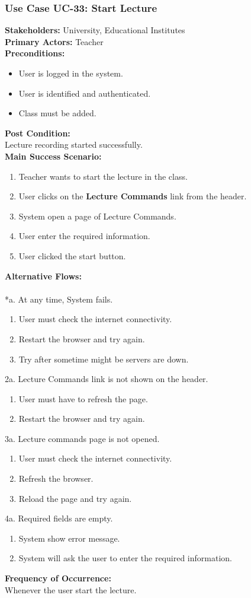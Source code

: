 \documentclass[12pt]{article}
\begin{document}
\subsubsection{Use Case UC-33: Start Lecture}
\textbf{Stakeholders: } University, Educational Institutes \\
\textbf{Primary Actors: }Teacher\\
\textbf{Preconditions:}
\begin{itemize}
\item User is logged in the system.
\item User is identified and authenticated.
\item Class must be added.
\end{itemize}
\textbf{Post Condition: }\\
Lecture recording started successfully.\\
\textbf{Main Success Scenario:}
\begin{enumerate}
\item Teacher wants to start the lecture in the class.
\item User clicks on the \textbf{Lecture Commands} link from the header.
\item System open a page of Lecture Commands.
\item User enter the required information.
\item User clicked the start button.
\end{enumerate}
\newpage
\textbf{Alternative Flows:}\\
\\
*a. At any time, System fails.
\begin{enumerate}
\item User must check the internet connectivity.
\item Restart the browser and try again.
\item Try after sometime might be servers are down.
\end{enumerate}
2a. Lecture Commands link is not shown on the header.
\begin{enumerate}
\item User must have to refresh the page.
\item Restart the browser and try again.
\end{enumerate} 
3a. Lecture commands page is not opened.
\begin{enumerate}
\item User must check the internet connectivity.
\item Refresh the browser.
\item Reload the page and try again.
\end{enumerate}
4a. Required fields are empty.
\begin{enumerate}
\item System show error message.
\item System will ask the user to enter the required information.
\end{enumerate}
\textbf{Frequency of Occurrence:}\\
Whenever the user start the lecture.
\end{document}
